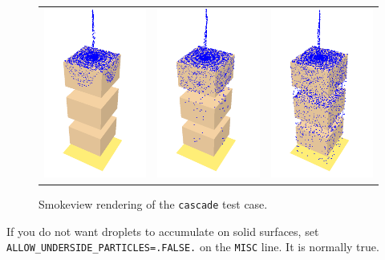 \documentclass[11pt]{book}
\newcommand{\ct}{\tt\small}
\begin{document}
\begin{figure}[ht]
\begin{center}
\begin{tabular}{lcr}
\includegraphics[height=2.2in]{SCRIPT_FIGURES/cascade_1} &
\includegraphics[height=2.2in]{SCRIPT_FIGURES/cascade_2} &
\includegraphics[height=2.2in]{SCRIPT_FIGURES/cascade_3}
\end{tabular}
\end{center}
\caption[Example of water cascading over solid obstructions]{Smokeview rendering of the {\ct cascade} test case.}
\label{cascade}
\end{figure}

\begin{warning}
\noindent If you do not want droplets to accumulate on solid surfaces, set {\ct ALLOW\_UNDERSIDE\_PARTICLES=.FALSE.} on the
{\ct MISC} line. It is normally true.
\end{warning}
\end{document}
